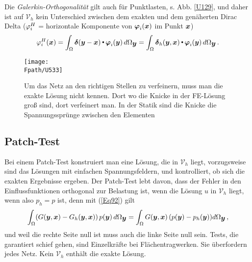 {\begin{remark}
Die {\em Galerkin-Orthogonalit\"{a}t\/} gilt auch f\"{u}r Punktlasten, s. Abb. \ref{U129}, und daher ist auf $\mathcal{V}_h$ kein Unterschied zwischen dem exakten und dem gen\"{a}herten Dirac Delta ($\varphi_{i}^H$ = horizontale Komponente von $\mbox{\boldmath $\varphi$}_i(\mbox{\boldmath $x$})$ im Punkt $\mbox{\boldmath $x$}$)
\begin{align}
\varphi_{i}^H(\mbox{\boldmath $x$}) = \int_{\Omega} \mbox{\boldmath $\delta$}(\mbox{\boldmath $y$} - \mbox{\boldmath $x$}) {\,\scriptscriptstyle \stackrel{\bullet}{{}}}\, \mbox{\boldmath $\varphi$}_i(\mbox{\boldmath $y$}) \,d\Omega_{\mbox{\boldmath $y$}} = \int_{\Omega} \mbox{\boldmath $\delta$}_h(\mbox{\boldmath $y$}, \mbox{\boldmath $x$}) {\,\scriptscriptstyle \stackrel{\bullet}{{}}}\, \mbox{\boldmath $\varphi$}_i(\mbox{\boldmath $y$}) \,d\Omega_{\mbox{\boldmath $y$}}\,.
\end{align}
\end{remark}
\begin{figure}[h]
\if {} \sidecaption \fi
\texttt{[image: \\Fpath/U533]}
\caption{Um das Netz an den richtigen Stellen zu verfeinern, muss man die exakte L\"{o}sung nicht kennen. Dort wo die Knicke in der FE-L\"{o}sung gro{\ss} sind, dort verfeinert man. In der Statik sind die Knicke die Spannungsspr\"{u}nge zwischen den Elementen}\label{U533}
\end{figure}
\vspace{-0.5cm}
{\textcolor{sectionTitleBlue}{\section{Patch-Test}}}\label{Patch-Test}
Bei einem Patch-Test konstruiert man eine L\"{o}sung, die in $\mathcal{V}_h$ liegt, vorzugsweise sind das L\"{o}sungen mit einfachen Spannungsfeldern, und kontrolliert, ob sich die exakten Ergebnisse ergeben. Der Patch-Test lebt davon, dass der Fehler in den Einflussfunktionen orthogonal zur Belastung ist, wenn die L\"{o}sung $u$ in  $\mathcal{V}_h$ liegt, wenn also $p_h = p$ ist, denn mit (\ref{Eq92}) gilt
\begin{align}
\int_{\Omega} (G(\mbox{\boldmath $y$},\mbox{\boldmath $x$}) - G_h(\mbox{\boldmath $y$},\mbox{\boldmath $x$}))\,p(\mbox{\boldmath $y$})\,d\Omega_{\mbox{\boldmath $y$}} = \int_{\Omega} G(\mbox{\boldmath $y$},\mbox{\boldmath $x$})\,(p(\mbox{\boldmath $y$}) - p_h(\mbox{\boldmath $y$}))d\Omega_{\mbox{\boldmath $y$}}\,,
\end{align}
und weil die rechte Seite null ist muss auch die linke Seite null sein. Tests, die garantiert schief gehen, sind Einzelkr\"{a}fte bei Fl\"{a}chentragwerken. Sie \"{u}berfordern jedes Netz. Kein $\mathcal{V}_h$ enth\"{a}lt die exakte L\"{o}sung.

}
